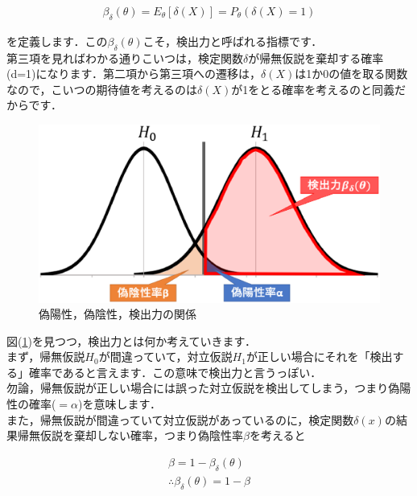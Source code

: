 \documentclass[11pt,a4paper]{ujreport} 	%
\begin{document}
\begin{align}
  \beta_\delta(\theta) = E_\theta[\delta(X)] = P_\theta(\delta(X)=1)
\end{align}

を定義します．この$\beta_\delta(\theta)$こそ，検出力と呼ばれる指標です．\\

第三項を見ればわかる通りこいつは，検定関数$\delta$が帰無仮説を棄却する確率(d=1)になります．第二項から第三項への遷移は，$\delta(X)$は1か0の値を取る関数なので，こいつの期待値を考えるのは$\delta(X)$が1をとる確率を考えるのと同義だからです．\\

\begin{figure}[H]
  \label{im:power}
  \includegraphics[width=15cm]{../figures/power-dist.eps}
  \caption{偽陽性，偽陰性，検出力の関係}
\end{figure}

図(\ref{im:power})を見つつ，検出力とは何か考えていきます．\\

まず，帰無仮説$H_0$が間違っていて，対立仮説$H_1$が正しい場合にそれを「検出する」確率であると言えます．この意味で検出力と言うっぽい．\\

勿論，帰無仮説が正しい場合には誤った対立仮説を検出してしまう，つまり偽陽性の確率($=\alpha$)を意味します．\\

また，帰無仮説が間違っていて対立仮説があっているのに，検定関数$\delta(x)$の結果帰無仮説を棄却しない確率，つまり偽陰性率$\beta$を考えると

\begin{align}
  \beta = 1- \beta_\delta(\theta)\\
  \therefore \beta_\delta(\theta) = 1- \beta
\end{align}
\end{document}
